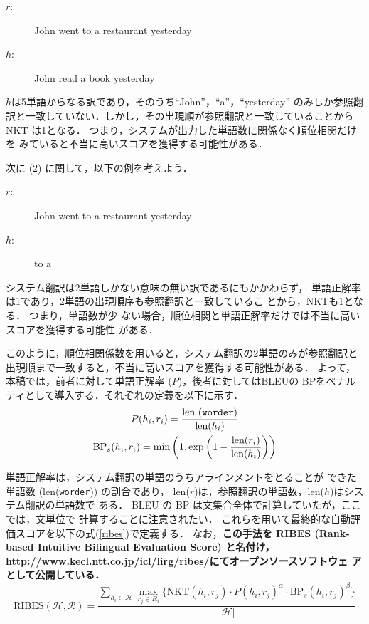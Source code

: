 \documentclass[japanese]{jnlp_1.4}
\begin{document}
\begin{description}
 \item[{\mdseries $r$:}] John went to a restaurant yesterday
 \item[{\mdseries $h$:}] John read a book yesterday
\end{description}

$h$は5単語からなる訳であり，そのうち``John''，``a''，``yesterday''
のみしか参照翻訳と一致していない．しかし，その出現順が参照翻訳と一致していることから
NKT は1となる． つまり，システムが出力した単語数に関係なく順位相関だけを
みていると不当に高いスコアを獲得する可能性がある．

次に (2) に関して，以下の例を考えよう．

\begin{description}
 \item[{\mdseries $r$:}] John went to a restaurant yesterday
 \item[{\mdseries $h$:}] to a
\end{description}

システム翻訳は2単語しかない意味の無い訳であるにもかかわらず，
単語正解率は1であり，2単語の出現順序も参照翻訳と一致しているこ
とから，NKTも1となる．
つまり，単語数が少
ない場合，順位相関と単語正解率だけでは不当に高いスコアを獲得する可能性
がある．

このように，順位相関係数を用いると，システム翻訳の2単語のみが参照翻訳と
出現順まで一致すると，不当に高いスコアを獲得する可能性がある．
よって，
本稿では，前者に対して単語正解率 ($P$)，後者に対してはBLEUの
BPをペナルティとして導入する．それぞれの定義を以下に示す．
\begin{gather}
 P(h_i,r_i)=\frac{\text{len (\texttt{worder})}}{\text{len}(h_i)} \\
 \text{BP}_s(h_i,r_i)=\min\left(1,\exp \left(1-\frac{\text{len}(r_i)}{\text{len}(h_i)}\right)\right)
\end{gather}

単語正解率は，システム翻訳の単語のうちアラインメントをとることが
できた単語数 (len({\tt worder})) の割合であり，
len($r$)は，参照翻訳の単語数，len($h$)はシステム翻訳の単語数で
ある．
BLEU の BP は文集合全体で計算していたが，ここでは，文単位で
計算することに注意されたい．
これらを用いて最終的な自動評価スコアを以下の式(\ref{ribes})で定義する．
なお，{\bf この手法を RIBES (Rank-based Intuitive Bilingual Evaluation Score) と名付け，
\url{http://www.kecl.ntt.co.jp/icl/lirg/ribes/}にてオープンソースソフトウェ
アとして公開している．}
\begin{equation}
\mbox{RIBES}(\mathcal{H},\mathcal{R})=\frac{\displaystyle\mathop\sum_{h_i \in \mathcal{H}}
\max_{r_j \in R_i} \{ \mbox{NKT}(h_i,r_j) \cdot P(h_i,r_j)^{\alpha}\cdot
\mbox{BP}_s(h_i,r_j)^{\beta}\}}{|\mathcal{H}|}
\label{ribes}
\end{equation}
\end{document}
